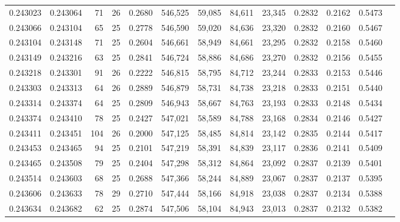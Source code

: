 \begin{tabular}{rrrrrrrrrrrrr}
0.243023 & 0.243064 &  71 &  26 &                                     0.2680 & 546,525 &  59,085 &  84,611 &  23,345 & 0.2832 & 0.2162 & 0.5473 \\
0.243066 & 0.243104 &  65 &  25 &                                     0.2778 & 546,590 &  59,020 &  84,636 &  23,320 & 0.2832 & 0.2160 & 0.5467 \\
0.243104 & 0.243148 &  71 &  25 &                                     0.2604 & 546,661 &  58,949 &  84,661 &  23,295 & 0.2832 & 0.2158 & 0.5460 \\
0.243149 & 0.243216 &  63 &  25 &                                     0.2841 & 546,724 &  58,886 &  84,686 &  23,270 & 0.2832 & 0.2156 & 0.5455 \\
0.243218 & 0.243301 &  91 &  26 &                                     0.2222 & 546,815 &  58,795 &  84,712 &  23,244 & 0.2833 & 0.2153 & 0.5446 \\
0.243303 & 0.243313 &  64 &  26 &                                     0.2889 & 546,879 &  58,731 &  84,738 &  23,218 & 0.2833 & 0.2151 & 0.5440 \\
0.243314 & 0.243374 &  64 &  25 &                                     0.2809 & 546,943 &  58,667 &  84,763 &  23,193 & 0.2833 & 0.2148 & 0.5434 \\
0.243374 & 0.243410 &  78 &  25 &                                     0.2427 & 547,021 &  58,589 &  84,788 &  23,168 & 0.2834 & 0.2146 & 0.5427 \\
0.243411 & 0.243451 & 104 &  26 &                                     0.2000 & 547,125 &  58,485 &  84,814 &  23,142 & 0.2835 & 0.2144 & 0.5417 \\
0.243453 & 0.243465 &  94 &  25 &                                     0.2101 & 547,219 &  58,391 &  84,839 &  23,117 & 0.2836 & 0.2141 & 0.5409 \\
0.243465 & 0.243508 &  79 &  25 &                                     0.2404 & 547,298 &  58,312 &  84,864 &  23,092 & 0.2837 & 0.2139 & 0.5401 \\
0.243514 & 0.243603 &  68 &  25 &                                     0.2688 & 547,366 &  58,244 &  84,889 &  23,067 & 0.2837 & 0.2137 & 0.5395 \\
0.243606 & 0.243633 &  78 &  29 &                                     0.2710 & 547,444 &  58,166 &  84,918 &  23,038 & 0.2837 & 0.2134 & 0.5388 \\
0.243634 & 0.243682 &  62 &  25 &                                     0.2874 & 547,506 &  58,104 &  84,943 &  23,013 & 0.2837 & 0.2132 & 0.5382 \\

\end{tabular}
